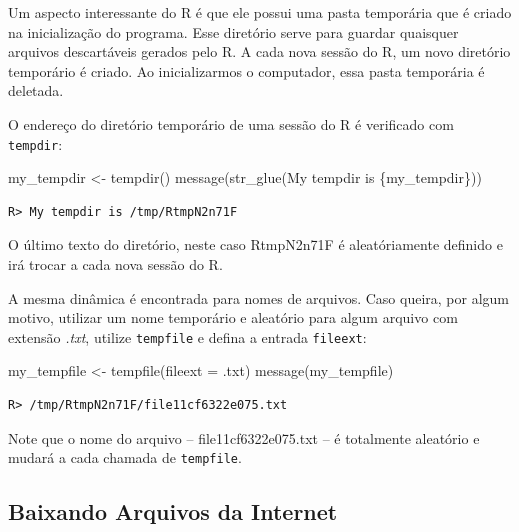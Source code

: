 \documentclass[
  11pt,
]{book}
\newenvironment{Shaded}{\begin{snugshade}}{\end{snugshade}}
\newcommand{\AttributeTok}[1]{\textcolor[rgb]{0.61,0.61,0.61}{#1}}
\newcommand{\FunctionTok}[1]{\textcolor[rgb]{0,0,0}{#1}}
\newcommand{\NormalTok}[1]{#1}
\newcommand{\OtherTok}[1]{\textcolor[rgb]{0.37,0.37,0.37}{#1}}
\newcommand{\StringTok}[1]{\textcolor[rgb]{0.5,0.5,0.5}{#1}}
\begin{document}
Um aspecto interessante do R é que ele possui uma pasta temporária que é criado na inicialização do programa. Esse diretório serve para guardar quaisquer arquivos descartáveis gerados pelo R. A cada nova sessão do R, um novo diretório temporário é criado. Ao inicializarmos o computador, essa pasta temporária é deletada.

O endereço do diretório temporário de uma sessão do R é verificado com \texttt{tempdir}:

\begin{Shaded}
\begin{Highlighting}[]
\NormalTok{my\_tempdir }\OtherTok{\textless{}{-}} \FunctionTok{tempdir}\NormalTok{()}
\FunctionTok{message}\NormalTok{(}\FunctionTok{str\_glue}\NormalTok{(}\StringTok{\textquotesingle{}My tempdir is \{my\_tempdir\}\textquotesingle{}}\NormalTok{))}
\end{Highlighting}
\end{Shaded}

\begin{verbatim}
R> My tempdir is /tmp/RtmpN2n71F
\end{verbatim}

O último texto do diretório, neste caso RtmpN2n71F é aleatóriamente definido e irá trocar a cada nova sessão do R.

A mesma dinâmica é encontrada para nomes de arquivos. Caso queira, por algum motivo, utilizar um nome temporário e aleatório para algum arquivo com extensão \emph{.txt}, utilize \texttt{tempfile} e defina a entrada \texttt{fileext}:

\begin{Shaded}
\begin{Highlighting}[]
\NormalTok{my\_tempfile }\OtherTok{\textless{}{-}} \FunctionTok{tempfile}\NormalTok{(}\AttributeTok{fileext =} \StringTok{\textquotesingle{}.txt\textquotesingle{}}\NormalTok{)}
\FunctionTok{message}\NormalTok{(my\_tempfile)}
\end{Highlighting}
\end{Shaded}

\begin{verbatim}
R> /tmp/RtmpN2n71F/file11cf6322e075.txt
\end{verbatim}

Note que o nome do arquivo -- file11cf6322e075.txt -- é totalmente aleatório e mudará a cada chamada de \texttt{tempfile}.

\hypertarget{baixando-arquivos-da-internet}{%
\subsection{Baixando Arquivos da Internet}\label{baixando-arquivos-da-internet}}
\end{document}
